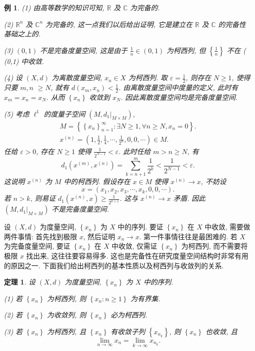 \documentclass[openany]{ctexbook}
\theoremstyle{kaiti}
\newtheorem{theorem}{定理}[section]
\theoremstyle{normal}
\newtheorem{example}{例}[section]
\begin{document}
\begin{example}
(1) 由高等数学的知识可知, $\mathbb{R}$ 及 $\mathbb{C}$ 为完备的.

(2) $\mathbb{R}^n$ 及 $\mathbb{C}^n$ 为完备的, 这一点我们以后给出证明, 它是建立在 $\mathbb{R}$ 及 $\mathbb{C}$ 的完备性基础之上的.

(3) $(0,1)$ 不是完备度量空间, 这是由于 $\frac{1}{n} \in(0,1)$ 为柯西列, 但 $\left\{\frac{1}{n}\right\}$ 不在 ( (0,1) 中收敛.

(4) 设 $(X, d)$ 为离散度量空间, $x_n \in X$ 为柯西列. 取 $\varepsilon=\frac{1}{2}$, 则存在 $N \geqslant 1$, 使得只要 $m, n$
$\geqslant N$, 就有 $d\left(x_m, x_n\right)<\frac{1}{2}$. 由离散度量空间中度量的定义, 此时有 $x_m=x_n=x_{N}$. 从而 $\left\{x_n\right\}$ 收敛到 $x_{N}$. 因此离散度量空间均是完备度量空间.

(5) 考虑 $\ell^1$ 的度量子空间 $\left(M,\left.d_1\right|_{M \times M}\right)$,
$$
\begin{gathered}
M=\left\{\left\{x_n\right\}_{n=1}^{\infty}: \exists N \geqslant 1, \forall n \geqslant N, x_n=0\right\}. \\
x^{(n)}=\left(1, \frac{1}{2}, \frac{1}{4}, \cdots, \frac{1}{2^n}, 0,0, \cdots\right) \in M.
\end{gathered}
$$
任给 $\varepsilon>0$, 存在 $N \geqslant 1$ 使得 $\frac{1}{2^{N-1}}<\varepsilon$. 此时任给 $m>n \geqslant N$, 有
$$
d_1\left(x^{(m)}, x^{(n)}\right)=\sum_{k=n+1}^m \frac{1}{2^{k}}<\frac{1}{2^{N-1}}<\varepsilon.
$$
这说明 $x^{(n)}$ 为 $M$ 中的柯西列. 假设存在 $x \in M$ 使得 $x^{(n)} \rightarrow x$, 不妨设
$$
x=\left(x_1, x_2, x_3, \cdots, x_{k}, 0,0, \cdots\right).
$$
若 $n>k$, 则易证 $d_1\left(x^{(n)}, x\right) \geqslant \frac{1}{2^{k+1}}$. 这与 $x^{(n)} \rightarrow x$ 矛盾. 因此 $\left(M,\left.d_1\right|_{M \times M}\right)$ 不是完备度量空间.
\end{example}

设 $(X, d)$ 为度量空间, $\left\{x_n\right\}$ 为 $X$ 中的序列. 要证 $\left\{x_n\right\}$ 在 $X$ 中收敛, 需要做两件事情: 首先找到极限 $x$, 然后证明 $x_n \rightarrow x$. 第一件事情往往是最困难的. 若 $X$ 为完备度量空间, 要证 $\left\{x_n\right\}$ 在 $X$ 中收敛, 仅需证 $\left\{x_n\right\}$ 为柯西列, 而不需要将极限 $x$ 找出来, 这往往要容易得多. 这也是完备性在研究度量空间结构时非常有用的原因之一. 下面我们给出柯西列的基本性质以及柯西列与收敛列的关系.

\begin{theorem}
  设 $(X, d)$ 为度量空间, $\left\{x_n\right\}$ 为 $X$ 中的序列.

  (1) 若 $\left\{x_n\right\}$ 为柯西列, 则 $\left\{x_n: n \geqslant 1\right\}$ 为有界集.

  (2) 若 $\left\{x_n\right\}$ 为收敛列, 则 $\left\{x_n\right\}$ 必为柯西列.

  (3) 若 $\left\{x_n\right\}$ 为柯西列, 且 $\left\{x_n\right\}$ 有收敛子列 $\left\{x_{n_{k}}\right\}$, 则 $\left\{x_n\right\}$ 也收敛, 且
  $$
  \lim_{n \rightarrow \infty} x_n=\lim_{k \rightarrow \infty} x_{n_{k}}.
  $$
\end{theorem}
\end{document}
